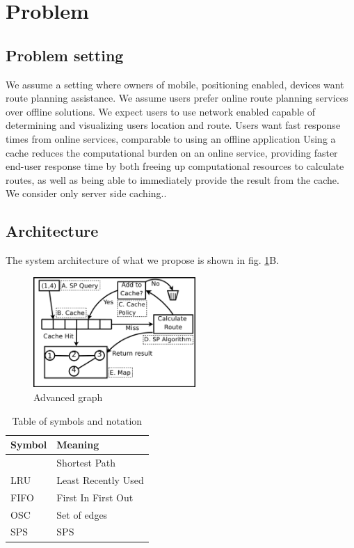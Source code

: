 \section{Problem}\label{sec:problemdef}

\subsection{Problem setting}\label{subsec:probset}
We assume a setting where owners of mobile, positioning enabled, devices want route planning assistance. We assume users prefer online route planning services over offline solutions. 
We expect users to use network enabled capable of determining and visualizing users location and route.
Users want fast response times from online services, comparable to using an offline application \cite{ref}
Using a cache reduces the computational burden \cite{ref} on an online service, providing faster end-user response time \cite{ref} by both freeing up computational resources to calculate \spath routes, as well as being able to immediately provide the \spath result from the cache.
We consider only server side caching..



\subsection{Architecture}

The system architecture of what we propose is shown in fig. \ref{fig:advancedroutequery}B. 


\begin{figure}
  \center
	\includegraphics[width=0.55\textwidth]{figures/advancedroutequery.pdf}
	\caption{Advanced graph}
  \label{fig:advancedroutequery}
\end{figure}

\begin{table}
\begin{tabular*}{\columnwidth}{|l||p{}|}
\hline
Symbol		& Meaning \\\hline
\spath		& Shortest Path \\\hline
LRU		& Least Recently Used \\\hline
FIFO		& First In First Out \\\hline
OSC		& Set of edges \\\hline
\acs{SPS} 	& \acl{SPS} \\\hline
\end{tabular*}
\caption{Table of symbols and notation} 
\label{tab:symbols}
\end{table}


